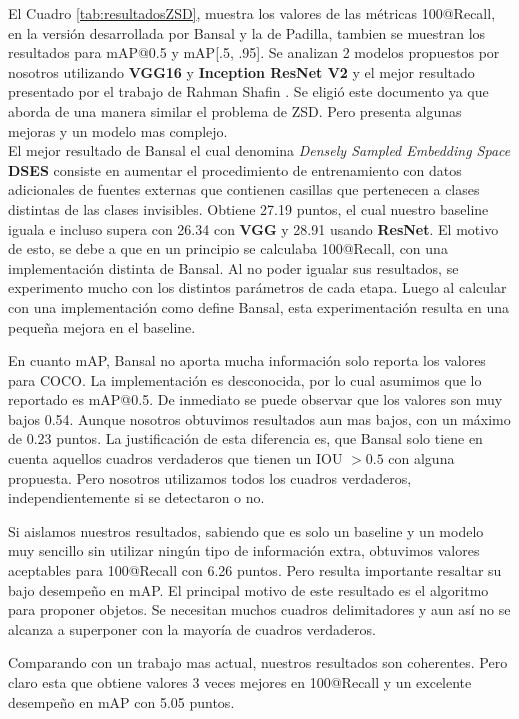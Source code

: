 El Cuadro \ref{tab:resultadosZSD}, muestra los valores de las métricas 100@Recall, en la versión desarrollada por Bansal y la de Padilla, tambien se muestran los resultados para mAP@0.5 y mAP[.5, .95]. Se analizan 2 modelos propuestos por nosotros utilizando \textbf{VGG16} y \textbf{Inception ResNet V2} y el mejor resultado presentado por el trabajo de Rahman Shafin \cite{rahman2020zero}. Se eligió este documento ya que aborda de una manera similar el problema de ZSD. Pero presenta algunas mejoras y un modelo mas complejo.\\

El mejor resultado de Bansal el cual denomina \textit{Densely Sampled Embedding Space} \textbf{DSES} consiste en aumentar el procedimiento de entrenamiento con datos adicionales de fuentes externas que contienen casillas que pertenecen a clases distintas de las clases invisibles. Obtiene 27.19 puntos, el cual nuestro baseline iguala e incluso supera con 26.34 con \textbf{VGG} y 28.91 usando \textbf{ResNet}. El motivo de esto, se debe a que en un principio se calculaba 100@Recall, con una implementación distinta de Bansal. Al no poder igualar sus resultados, se experimento mucho con los distintos parámetros de cada etapa. Luego al calcular con una implementación como define Bansal, esta experimentación resulta en una pequeña mejora en el baseline.

En cuanto mAP, Bansal no aporta mucha información solo reporta los valores para COCO. La implementación es desconocida, por lo cual asumimos que lo reportado es mAP@0.5. De inmediato se puede observar que los valores son muy bajos 0.54. Aunque nosotros obtuvimos resultados aun mas bajos, con un máximo de 0.23 puntos. La justificación de esta diferencia es, que Bansal solo tiene en cuenta aquellos cuadros verdaderos que tienen un IOU $> 0.5$ con alguna propuesta. Pero nosotros utilizamos todos los cuadros verdaderos, independientemente si se detectaron o no. 
	
Si aislamos nuestros resultados, sabiendo que es solo un baseline y un modelo muy sencillo sin utilizar ningún tipo de información extra, obtuvimos valores aceptables para 100@Recall con 6.26 puntos. Pero resulta importante resaltar su bajo desempeño en mAP. El principal motivo de este resultado es el algoritmo para proponer objetos. Se necesitan muchos cuadros delimitadores y aun así no se alcanza a superponer con la mayoría de cuadros verdaderos.

Comparando con un trabajo mas actual, nuestros resultados son coherentes. Pero claro esta que obtiene valores 3 veces mejores en  100@Recall y un excelente desempeño en mAP con 5.05 puntos.\\

